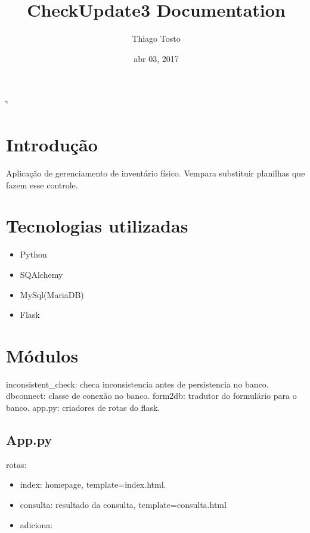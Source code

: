 \documentclass[letterpaper,10pt,openany,oneside,portuges]{sphinxmanual}
\title{CheckUpdate3 Documentation}
\date{abr 03, 2017}
\author{Thiago Tosto}
\begin{document}
\if\catcode`\"\active{}\fi
\maketitle
\sphinxtableofcontents
{}\label{\detokenize{index::doc}}



\chapter{Introdução}
\label{\detokenize{intro:introducao}}\label{\detokenize{intro:welcome-to-checkupdate3-s-documentation}}\label{\detokenize{intro::doc}}
Aplicação de gerenciamento de inventário físico. Vempara substituir planilhas que fazem esse controle.


\chapter{Tecnologias utilizadas}
\label{\detokenize{tecnologias::doc}}\label{\detokenize{tecnologias:tecnologias-utilizadas}}\begin{itemize}
\item {} 
Python

\item {} 
SQAlchemy

\item {} 
MySql(MariaDB)

\item {} 
Flask

\end{itemize}


\chapter{Módulos}
\label{\detokenize{classes:modulos}}\label{\detokenize{classes::doc}}
inconsistent\_check: checa inconsistencia antes de persistencia no banco.
dbconnect: classe de conexão no banco.
form2db: tradutor do formulário para o banco.
app.py: criadores de rotas do flask.


\section{App.py}
\label{\detokenize{classes:app-py}}
rotas:
\begin{itemize}
\item {} 
index: homepage, template=index.html.

\item {} 
consulta: resultado da consulta, template=consulta.html

\item {} 
adiciona:

\end{itemize}
\end{document}
